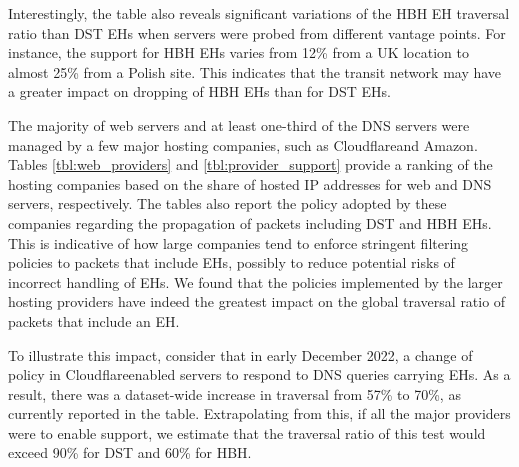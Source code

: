 \documentclass[conference]{IEEEtran}
\begin{document}
Interestingly, the table also reveals significant variations of the HBH EH
traversal ratio than DST EHs when servers were probed from different vantage
points. For instance, the support for HBH EHs varies from 12\% from a UK
location to almost 25\% from a Polish site.  This indicates that the transit
network may have a greater impact on dropping of HBH EHs than for DST EHs.  



The  majority of web servers and at least one-third of the
DNS servers were managed by a few major hosting companies, such
as Cloudflare\texttrademark and Amazon\texttrademark.  Tables
\ref{tbl:web_providers} and \ref{tbl:provider_support} provide a ranking of the
hosting companies based on the share of hosted IP addresses for web and DNS
servers, respectively. The tables also report the policy adopted by these
companies regarding the propagation of packets including DST and HBH EHs.  
This is indicative of how large companies tend to enforce stringent filtering policies to
packets that include EHs, possibly to reduce potential
risks of incorrect handling of EHs.  We found that the policies implemented by
the larger hosting providers have indeed the greatest impact on the global
traversal ratio of packets that include an EH. 



To illustrate this impact, consider that in early December 2022, a change of
policy in Cloudflare\texttrademark enabled servers to respond to DNS queries
carrying EHs.  As a result, there was a dataset-wide increase in traversal
from 57\% to 70\%, as currently reported in the table.  Extrapolating from
this, if all the major providers were to enable support, we estimate that the
traversal ratio of this test would exceed 90\% for DST and 60\% for HBH.
\end{document}
